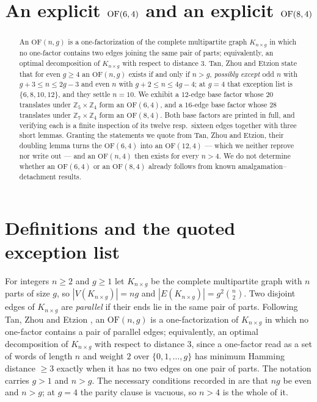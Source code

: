 \documentclass[11pt]{amsart}
\title[An explicit $\OF(6,4)$ and $\OF(8,4)$]
{An explicit $\OF(6,4)$ and an explicit $\OF(8,4)$}
\date{}
\theoremstyle{remark}
\newcommand{\OF}{\mathrm{OF}}
\newcommand{\Km}[2]{K_{#1\times #2}}
\newcommand{\Zp}{\mathbb Z}
\begin{document}
\begin{abstract}
An $\OF(n,g)$ is a one-factorization of the complete multipartite graph
$\Km ng$ in which no one-factor contains two edges joining the same pair of
parts; equivalently, an optimal decomposition of $\Km ng$ with respect to
distance $3$. Tan, Zhou and Etzion state that for even $g\ge4$ an $\OF(n,g)$
exists if and only if $n>g$, \emph{possibly except} odd $n$ with
$g+3\le n\le 2g-3$ and even $n$ with $g+2\le n\le 4g-4$; at $g=4$ that
exception list is $\{6,8,10,12\}$, and they settle $n=10$. We exhibit a
$12$-edge base factor whose $20$ translates under $\Zp_5\times\Zp_4$ form an
$\OF(6,4)$, and a $16$-edge base factor whose $28$ translates under
$\Zp_7\times\Zp_4$ form an $\OF(8,4)$. Both base factors are printed in full,
and verifying each is a finite inspection of its twelve resp.\ sixteen edges
together with three short lemmas. Granting the statements we quote from Tan,
Zhou and Etzion, their doubling lemma turns the $\OF(6,4)$ into an $\OF(12,4)$
--- which we neither reprove nor write out --- and an $\OF(n,4)$ then exists for
every $n>4$. We do not determine whether an $\OF(6,4)$ or an $\OF(8,4)$ already
follows from known amalgamation--detachment results.
\end{abstract}

\maketitle

\section{Definitions and the quoted exception list}

For integers $n\ge2$ and $g\ge1$ let $\Km ng$ be the complete multipartite
graph with $n$ parts of size $g$, so
$|V(\Km ng)|=ng$ and $|E(\Km ng)|=g^2\binom n2$. Two disjoint edges of
$\Km ng$ are \emph{parallel} if their ends lie in the same pair of parts.
Following Tan, Zhou and Etzion \cite{TZE}, an $\OF(n,g)$ is a
one-factorization of $\Km ng$ in which no one-factor contains a pair of
parallel edges; equivalently, an optimal decomposition of $\Km ng$ with respect
to distance $3$, since a one-factor read as a set of words of length $n$ and
weight $2$ over $\{0,1,\dots,g\}$ has minimum Hamming distance $\ge3$ exactly
when it has no two edges on one pair of parts. The notation carries $g>1$ and
$n>g$. The necessary conditions recorded in \cite{TZE} are that $ng$ be
even and $n>g$; at $g=4$ the parity clause is vacuous, so $n>4$ is the whole of
it.
\end{document}
